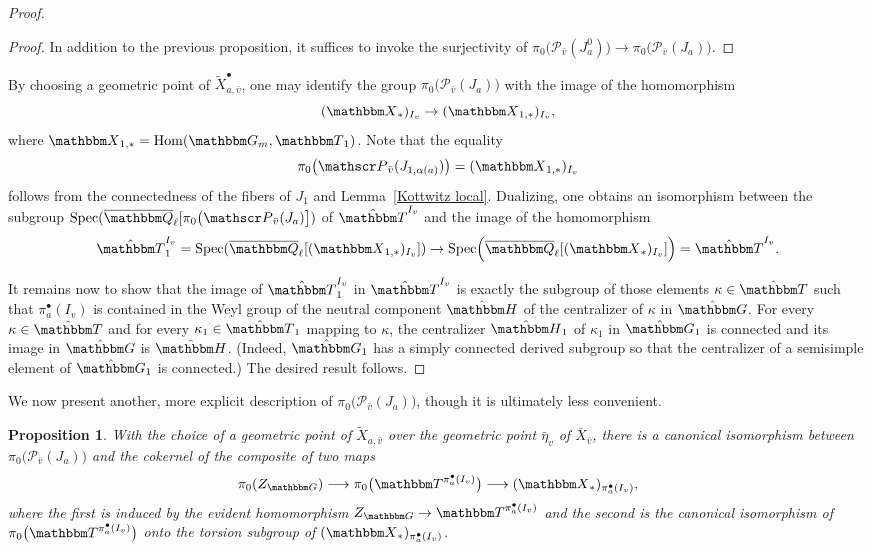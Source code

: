 \documentclass[12pt,english]{smfart}
\numberwithin{equation}{subsection}
\newtheorem{proposition}[equation]{Proposition}
\theoremstyle{remark}
\newcommand\calP{{\mathscr P}}
\newcommand\GG{{\mathbbm G}}
\newcommand\QQ{{\mathbbm Q}}
\newcommand\bbH{{\mathbbm H}}
\newcommand\bbT{{\mathbbm T}}
\newcommand\bbG{{\mathbbm G}}
\newcommand\bbX{{\mathbbm X}}
\newcommand\Spec{{\rm Spec}}
\newcommand\Hom{{\rm Hom}}
\newcommand\Ql{{\overline\QQ_\ell}}
\begin{document}
\begin{proof}
\begin{proof}
In addition to the previous proposition, it suffices to invoke the surjectivity of $\pi_0\bigl(\calP_{\bar v}(J_a^0)\bigr)\to \pi_0\bigl(\calP_{\bar v}(J_a)\bigr)$.
\end{proof}

By choosing a geometric point of $\widetilde X_{a,\bar v}^\bullet$, one may identify the group $\pi_0\bigl(\calP_{\bar v}(J_a)\bigr)$ with the image of the homomorphism
$$
(\bbX_*)_{I_v} \to (\bbX_{1,*})_{I_v},
$$
where $\bbX_{1,*}=\Hom(\GG_m,\bbT_1)$. Note that the equality
$$
\pi_0\bigl(\calP_{\bar v}(J_{1,\alpha(a)})\bigr) = (\bbX_{1,*})_{I_v}
$$
follows from the connectedness of the fibers of $J_1$ and Lemma~\ref{Kottwitz local}. Dualizing, one obtains an isomorphism between the subgroup $\Spec(\Ql[\pi_0\bigl(\calP_{\bar v}(J_a)\bigr])$ of $\hat{\bbT}^{I_v}$ and the image of the homomorphism
$$
\hat{\bbT}_1^{I_v}=\Spec(\Ql[(\bbX_{1,*})_{I_v}]) \to \Spec\Bigl(\Ql[(\bbX_*)_{I_v}]\Bigr)=\hat{\bbT}^{I_v}.
$$

It remains now to show that the image of $\hat{\bbT}_1^{I_v}$ in $\hat{\bbT}^{I_v}$ is exactly the subgroup of those elements $\kappa\in \hat{\bbT}$ such that $\pi_a^\bullet(I_v)$ is contained in the Weyl group of the neutral component $\hat{\bbH}$ of the centralizer of $\kappa$ in $\hat{\bbG}$. For every $\kappa\in\hat{\bbT}$ and for every $\kappa_1\in\hat{\bbT}_1$ mapping to $\kappa$, the centralizer $\hat{\bbH}_1$ of $\kappa_1$ in $\hat{\bbG}_1$ is connected and its image in $\hat{\bbG}$ is $\hat{\bbH}$. (Indeed, $\hat{\bbG}_{1}$ has a simply connected derived subgroup so that the centralizer of a semisimple element of $\hat{\bbG}_{1}$ is connected.) The desired result follows.
\end{proof}

We now present another, more explicit description of $\pi_0\bigl(\calP_{\bar v}(J_a)\bigr)$, though it is ultimately less convenient.

\begin{proposition}
With the choice of a geometric point of $\widetilde X_{a,\bar v}$ over the geometric point $\bar{\eta}_{v}$ of $\bar X_{\bar v}$, there is a canonical isomorphism between $\pi_0\bigl(\calP_{\bar v}(J_a)\bigr)$ and the cokernel of the composite of two maps
$$
\pi_0(Z_{\GG}) \longrightarrow \pi_0\bigl(\bbT^{\pi_a^\bullet(I_v)}\bigr) \longrightarrow (\bbX_*)_{\pi_a^\bullet(I_v)},
$$
where the first is induced by the evident homomorphism $Z_{\GG}\to \bbT^{\pi_a^\bullet(I_v)}$ and the second is the canonical isomorphism of $\pi_0\bigl(\bbT^{\pi_a^\bullet(I_v)}\bigr)$ onto the torsion subgroup of $(\bbX_*)_{\pi_a^\bullet(I_v)}$.
\end{proposition}
\end{document}
